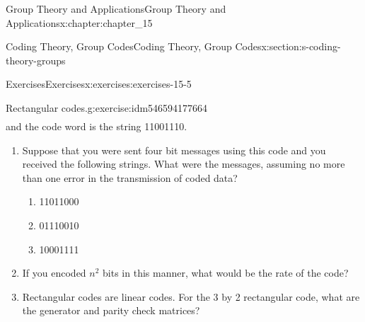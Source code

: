 \documentclass[oneside,10pt,]{book}
\numberwithin{equation}{section}
\begin{document}
\begin{chapterptx}{Group Theory and Applications}{}{Group Theory and Applications}{}{}{x:chapter:chapter_15}
\begin{sectionptx}{Coding Theory, Group Codes}{}{Coding Theory, Group Codes}{}{}{x:section:s-coding-theory-groups}
\begin{exercises-subsection}{Exercises}{}{Exercises}{}{}{x:exercises:exercises-15-5}
\begin{divisionexercise}{6}{Rectangular codes.}{}{g:exercise:idm546594177664}
\begin{equation*}
\begin{array}{cc|c}
\end{array}
\end{equation*}
and the code word is the string 11001110.%
\par
%
\begin{enumerate}[label=(\alph*)]
\item{}Suppose that you were sent four bit messages using this code and you received the following strings.  What were the messages, assuming no more than one error in the transmission of coded data?%
\begin{multicols}{3}
\begin{enumerate}[label=(\roman*)]
\item{}11011000%
\item{}01110010%
\item{}10001111%
\end{enumerate}
\end{multicols}
%
\item{}If you encoded \(n^2\) bits in this manner, what would be the rate of the code?%
\item{}Rectangular codes are linear codes.  For the 3 by 2 rectangular code, what are the generator and parity check matrices?%
\end{enumerate}
%
\end{divisionexercise}%
\end{exercises-subsection}
\end{sectionptx}
\end{chapterptx}
%
%
\typeout{************************************************}
\typeout{************************************************}
%
\end{document}
